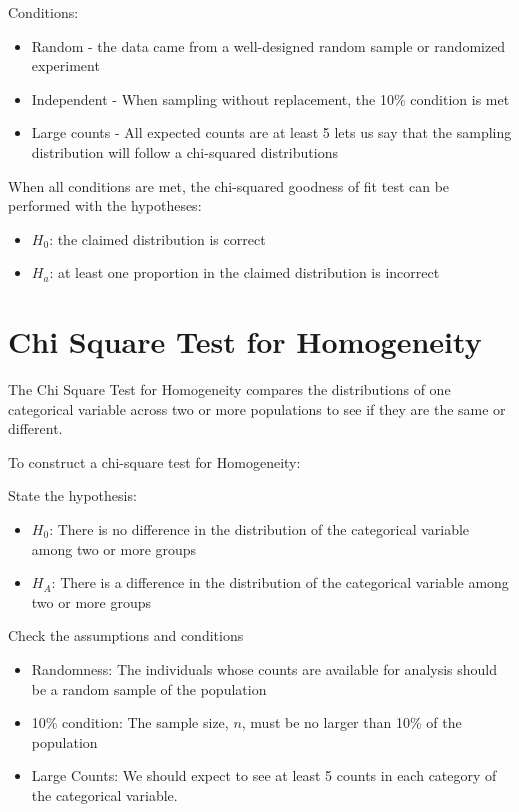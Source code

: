 \documentclass[../stats.tex]{subfiles}
\begin{document}
Conditions:
\begin{itemize}
    \item Random - the data came from a well-designed random sample or randomized experiment 
    \item Independent - When sampling without replacement, the 10\% condition is met 
    \item Large counts - All expected counts are at least 5 lets us say that the sampling distribution will follow a chi-squared distributions
\end{itemize}

When all conditions are met, the chi-squared goodness of fit test can be performed with the hypotheses:
\begin{itemize}
    \item $H_0$: the claimed distribution is correct
    \item $H_a$: at least one proportion in the claimed distribution is incorrect
\end{itemize}


\section{Chi Square Test for Homogeneity}
The Chi Square Test for Homogeneity compares the distributions of one categorical variable across two or more populations to see if they are the same or different.

To construct a chi-square test for Homogeneity:

State the hypothesis:
\begin{itemize}
    \item $H_0$: There is no difference in the distribution of the categorical variable among two or more groups 
    \item $H_A$: There is a difference in the distribution of the categorical variable among two or more groups 
\end{itemize}

Check the assumptions and conditions 
\begin{itemize}
    \item Randomness: The individuals whose counts are available for analysis should be a random sample of the population 
    \item 10\% condition: The sample size, $n$, must be no larger than 10\% of the population 
    \item Large Counts: We should expect to see at least 5 counts in each category of the categorical variable.
\end{itemize}
\end{document}

